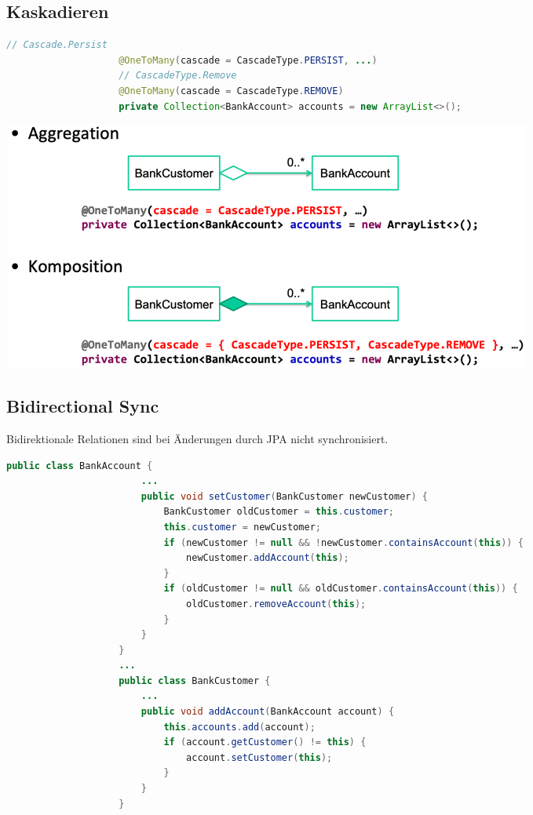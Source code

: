 \documentclass[a4paper, landscape, 8pt]{scrartcl}
\begin{document}
\begin{multicols*}{4}
        \subsection{Kaskadieren}
        \begin{lstlisting}[language=java]
                    // Cascade.Persist
                    @OneToMany(cascade = CascadeType.PERSIST, ...)
                    // CascadeType.Remove
                    @OneToMany(cascade = CascadeType.REMOVE)
                    private Collection<BankAccount> accounts = new ArrayList<>();
        \end{lstlisting}
        \includegraphics[scale=0.24]{graphic/10-relations-with-dependencies}

        \subsection{Bidirectional Sync}
        Bidirektionale Relationen sind bei Änderungen durch JPA nicht synchronisiert.
        \begin{lstlisting}[language=java]
                    public class BankAccount {
                        ...
                        public void setCustomer(BankCustomer newCustomer) {
                            BankCustomer oldCustomer = this.customer;
                            this.customer = newCustomer;
                            if (newCustomer != null && !newCustomer.containsAccount(this)) {
                                newCustomer.addAccount(this);
                            }
                            if (oldCustomer != null && oldCustomer.containsAccount(this)) {
                                oldCustomer.removeAccount(this);
                            }
                        }
                    }
                    ...
                    public class BankCustomer {
                        ...
                        public void addAccount(BankAccount account) {
                            this.accounts.add(account);
                            if (account.getCustomer() != this) {
                                account.setCustomer(this);
                            }
                        }
                    }
        \end{lstlisting}


\end{multicols*}
\end{document}
